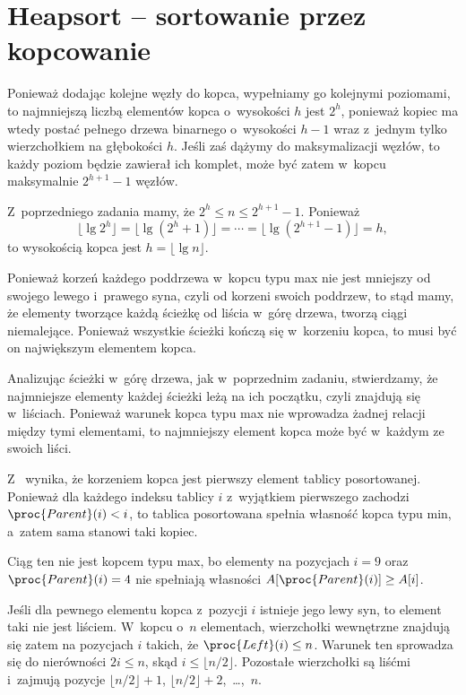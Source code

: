 \chapter{Heapsort -- sortowanie przez kopcowanie}


\exercise %
Ponieważ dodając kolejne węzły do kopca, wypełniamy go kolejnymi poziomami, to najmniejszą liczbą elementów kopca o~wysokości $h$ jest $2^h$, ponieważ kopiec ma wtedy postać pełnego drzewa binarnego o~wysokości $h-1$ wraz z~jednym tylko wierzchołkiem na głębokości $h$. Jeśli zaś dążymy do maksymalizacji węzłów, to każdy poziom będzie zawierał ich komplet, może być zatem w~kopcu maksymalnie $2^{h+1}-1$ węzłów.

\exercise %
Z~poprzedniego zadania mamy, że $2^h\le n\le 2^{h+1}-1$. Ponieważ
\[
	\lfloor\lg2^h\rfloor = \lfloor\lg(2^h+1)\rfloor = \cdots = \lfloor\lg(2^{h+1}-1)\rfloor = h,
\]
to wysokością kopca jest $h=\lfloor\lg n\rfloor$.

\exercise %
Ponieważ korzeń każdego poddrzewa w~kopcu typu max nie jest mniejszy od swojego lewego i~prawego syna, czyli od korzeni swoich poddrzew, to stąd mamy, że elementy tworzące każdą ścieżkę od liścia w~górę drzewa, tworzą ciągi niemalejące. Ponieważ wszystkie ścieżki kończą się w~korzeniu kopca, to musi być on największym elementem kopca.

\exercise %
Analizując ścieżki w~górę drzewa, jak w~poprzednim zadaniu, stwierdzamy, że najmniejsze elementy każdej ścieżki leżą na ich początku, czyli znajdują się w~liściach. Ponieważ warunek kopca typu max nie wprowadza żadnej relacji między tymi elementami, to najmniejszy element kopca może być w~każdym ze swoich liści.

\exercise %
Z~ wynika, że korzeniem kopca jest pierwszy element tablicy posortowanej. Ponieważ dla każdego indeksu tablicy $i$ z~wyjątkiem pierwszego zachodzi $\proc{Parent}(i)<i$, to tablica posortowana spełnia własność kopca typu min, a~zatem sama stanowi taki kopiec.

\exercise %
Ciąg ten nie jest kopcem typu max, bo elementy na pozycjach $i=9$ oraz $\proc{Parent}(i)=4$ nie spełniają własności $A[\proc{Parent}(i)]\ge A[i]$.

\exercise %
Jeśli dla pewnego elementu kopca z~pozycji $i$ istnieje jego lewy syn, to element taki nie jest liściem. W~kopcu o~$n$ elementach, wierzchołki wewnętrzne znajdują się zatem na pozycjach $i$ takich, że $\proc{Left}(i)\le n$. Warunek ten sprowadza się do nierówności $2i\le n$, skąd $i\le\lfloor n/2\rfloor$. Pozostałe wierzchołki są liśćmi i~zajmują pozycje $\lfloor n/2\rfloor+1$, $\lfloor n/2\rfloor+2$,~\dots,~$n$.

